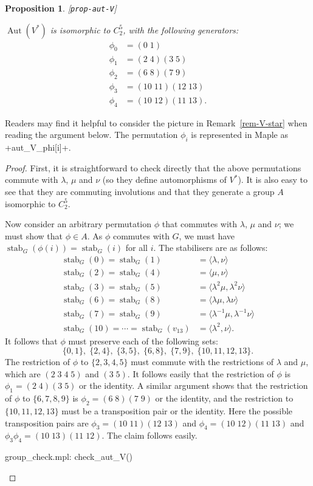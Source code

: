 \documentclass[reqno]{amsart}
\newcommand{\lbl}[1]{\label{#1}\textup{[\texttt{#1}]}\par}
\newcommand{\lbl}{\label}
\newcommand{\Aut}	{\operatorname{Aut}}
\newcommand{\stab}	{\operatorname{stab}}
\newcommand{\lm}        {\lambda}
\newcommand{\ip}[1]     {\langle #1\rangle}
\renewcommand{\:}{\colon}
\newtheorem{proposition}[theorem]{Proposition}
\theoremstyle{definition}
\begin{document}
\begin{proposition}\lbl{prop-aut-V}
 $\Aut(V^*)$ is isomorphic to $C_2^5$, with the following generators:
 \begin{align*}
  \phi_0 &= (0\;1) \\
  \phi_1 &= (2\;4)(3\;5) \\
  \phi_2 &= (6\;8)(7\;9) \\
  \phi_3 &= (10\;11)(12\;13) \\
  \phi_4 &= (10\;12)(11\;13).
 \end{align*}
\end{proposition}
Readers may find it helpful to consider the picture in
Remark~\ref{rem-V-star} when reading the argument below.  The
permutation $\phi_i$ is represented in Maple as \mcode+aut_V_phi[i]+.
\begin{proof}
 First, it is straightforward to check directly that the above
 permutations commute with $\lm$, $\mu$ and $\nu$ (so they define
 automorphisms of $V^*$).  It is also easy to see that they are
 commuting involutions and that they generate a group $A$ isomorphic
 to $C_2^5$.

 Now consider an arbitrary permutation $\phi$ that commutes with
 $\lm$, $\mu$ and $\nu$; we must show that $\phi\in A$.  As $\phi$
 commutes with $G$, we must have $\stab_G(\phi(i))=\stab_G(i)$ for all
 $i$.  The stabilisers are as follows:
 \begin{align*}
  \stab_G(0) = \stab_G(1) &= \ip{\lm,\nu} \\
  \stab_G(2) = \stab_G(4) &= \ip{\mu,\nu} \\
  \stab_G(3) = \stab_G(5) &= \ip{\lm^2\mu,\lm^2\nu} \\
  \stab_G(6) = \stab_G(8) &= \ip{\lm\mu,\lm\nu} \\
  \stab_G(7) = \stab_G(9) &= \ip{\lm^{-1}\mu,\lm^{-1}\nu} \\
  \stab_G(10) = \dotsb = \stab_G(v_{13}) &= \ip{\lm^2,\nu}.
 \end{align*}
 It follows that $\phi$ must preserve each of the following sets:
 \[ \{0,1\},\;\{2,4\},\;\{3,5\},\;\{6,8\},\;\{7,9\},\;
      \{10,11,12,13\}.
 \]
 The restriction of $\phi$ to $\{2,3,4,5\}$ must commute with the
 restrictions of $\lm$ and $\mu$, which are $(2\;3\;4\;5)$ and
 $(3\;5)$.  It follows easily that the restriction of $\phi$ is
 $\phi_1=(2\;4)(3\;5)$ or the identity.  A similar argument shows that
 the restriction of $\phi$ to $\{6,7,8,9\}$ is $\phi_2=(6\;8)(7\;9)$
 or the identity, and the restriction to $\{10,11,12,13\}$ must be a
 transposition pair or the identity.  Here the possible transposition
 pairs are $\phi_3=(10\;11)(12\;13)$ and $\phi_4=(10\;12)(11\;13)$ and
 $\phi_3\phi_4=(10\;13)(11\;12)$.  The claim follows easily.
 \begin{checks}
  group_check.mpl: check_aut_V()
 \end{checks}
\end{proof}
\end{document}
